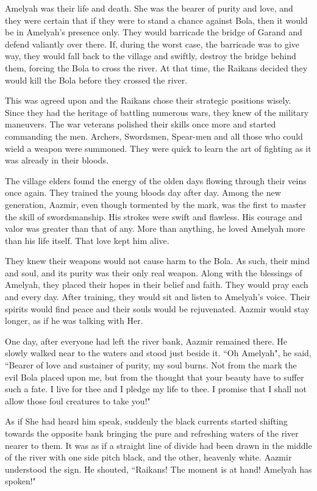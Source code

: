 \documentclass[twoside,11pt,titlepage]{article}
\begin{document}
Amelyah was their life and death. She was the bearer of purity and love, and they were certain that if they were to stand a chance against Bola, then it would be in Amelyah's presence only. They would barricade the bridge of Garand and defend valiantly over there. If, during the worst case, the barricade was to give way, they would fall back to the village and swiftly, destroy the bridge behind them, forcing the Bola to cross the river. At that time, the Raikans decided they would kill the Bola before they crossed the river.

This was agreed upon and the Raikans chose their strategic positions wisely. Since they had the heritage of battling numerous wars, they knew of the military maneuvers. The war veterans polished their skills once more and started commanding the men. Archers, Swordsmen, Spear-men and all those who could wield a weapon were summoned. They were quick to learn the art of fighting as it was already in their bloods.

The village elders found the energy of the olden days flowing through their veins once again. They trained the young bloods day after day. Among the new generation, Aazmir, even though tormented by the mark, was the first to master the skill of swordsmanship. His strokes were swift and flawless. His courage and valor was greater than that of any. More than anything, he loved Amelyah more than his life itself. That love kept him alive.

They knew their weapons would not cause harm to the Bola. As such, their mind and soul, and its purity was their only real weapon. Along with the blessings of Amelyah, they placed their hopes in their belief and faith. They would pray each and every day. After training, they would sit and listen to Amelyah's voice. Their spirits would find peace and their souls would be rejuvenated. Aazmir would stay longer, as if he was talking with Her.

One day, after everyone had left the river bank, Aazmir remained there. He slowly walked near to the waters and stood just beside it. ``Oh Amelyah", he said, ``Bearer of love and sustainer of purity, my soul burns. Not from the mark the evil Bola placed upon me, but from the thought that your beauty have to suffer such a fate. I live for thee and I pledge my life to thee. I promise that I shall not allow those foul creatures to take you!"

As if She had heard him speak, suddenly the black currents started shifting towards the opposite bank bringing the pure and refreshing waters of the river nearer to them. It was as if a straight line of divide had been drawn in the middle of the river with one side pitch black, and the other, heavenly white. Aazmir understood the sign. He shouted, ``Raikans! The moment is at hand! Amelyah has spoken!"
\end{document}
